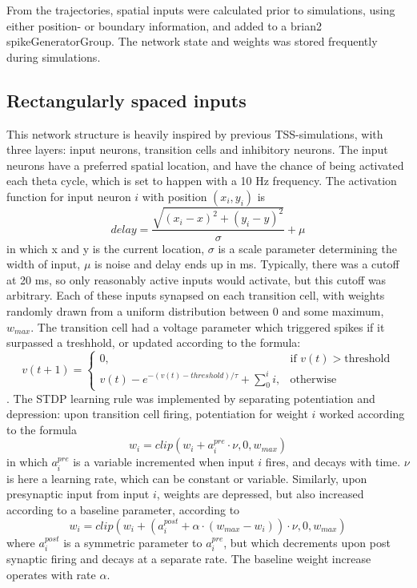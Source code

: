 \documentclass{article}
\begin{document}
    From the trajectories, spatial inputs were calculated prior to simulations, using either position- or boundary information, and added to a brian2 spikeGeneratorGroup. The network state and weights was stored frequently during simulations.

    \subsection{Rectangularly spaced inputs} This network structure is heavily inspired by previous TSS-simulations, with three layers: input neurons, transition cells and inhibitory neurons. The input neurons have a preferred spatial location, and have the chance of being activated each theta cycle, which is set to happen with a 10 Hz frequency. The activation function for input neuron \(i\) with position \((x_i, y_i)\) is \begin{equation} \label{key1} delay = \frac{\sqrt{(x_i - x)^2 + (y_i - y)^2}}{\sigma} + \mu\end{equation}
    in which x and y is the current location, \(\sigma\) is a scale parameter determining the width of input, \(\mu\) is noise and delay ends up in ms. Typically, there was a cutoff at 20 ms, so only reasonably active inputs would activate, but this cutoff was arbitrary. Each of these inputs synapsed on each transition cell, with weights randomly drawn from a uniform distribution between 0 and some maximum, \(w_{max}\). The transition cell had a voltage parameter which triggered spikes if it surpassed a treshhold, or updated according to the formula: \[ v(t+1) =  \begin{cases} 0, & \text{if } v(t) > \text{threshold}\\ v(t) - e^{-(v(t) - threshold) / \tau} + \sum_{0}^{i} i, & \text{otherwise}  
    \end{cases}
        \].
    The STDP learning rule was implemented by separating potentiation and depression: upon transition cell firing, potentiation for weight \(i\) worked according to the formula \begin{equation} \label{key3} w_i = clip(w_i + a^{pre}_i \cdot \nu, 0, w_{max})\end{equation} in which \(a^{pre}_i\) is a variable incremented when input \(i\) fires, and decays with time. \(\nu\) is here a learning rate, which can be constant or variable. 
    Similarly, upon presynaptic input from input \(i\), weights are depressed, but also increased according to a baseline parameter, according to \begin{equation} \label{key4} w_i = clip(w_i + (a^{post}_i + \alpha \cdot (w_{max}-w_i)) \cdot \nu, 0, w_{max})\end{equation} where \(a^{post}_i\) is a symmetric parameter to \(a^{pre}_i\), but which decrements upon post synaptic firing and decays at a separate rate. The baseline weight increase operates with rate \(\alpha\).
\end{document}
